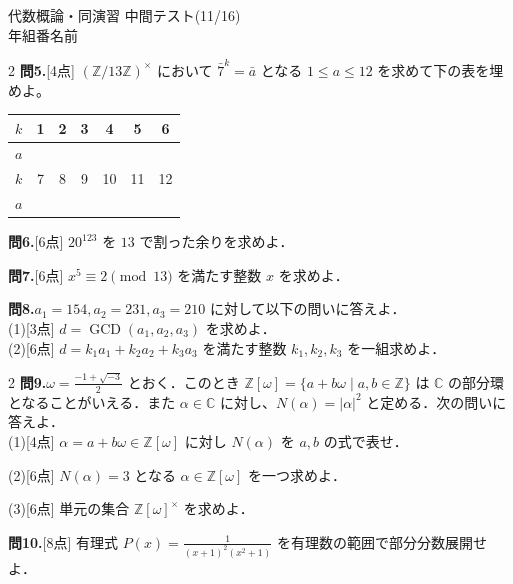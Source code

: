 \documentclass[a4paper,11pt]{jsarticle}
\newcommand{\testheader}{
\begin{center}
{\large 代数概論・同演習 中間テスト(11/16)}\\[1em]
\underline{\hspace{1cm}}年\underline{\hspace{1cm}}組\underline{\hspace{1cm}}番\hspace{0.5cm}名前\underline{\hspace{6cm}}
\end{center}
}
\begin{document}
\newpage

\testheader

\begin{multicols*}{2}
\noindent
\textbf{問5.}[4点] $(\mathbb{Z}/13\mathbb{Z})^{\times}$ において $\bar{7}^k = \bar{a}$ となる $1 \le a \le 12$ を求めて下の表を埋めよ。\\[0.5em]
\begin{tabular}{|c|c|c|c|c|c|c|}
\hline
$k$ & 1 & 2 & 3 & 4 & 5 & 6 \\ \hline
$a$ &  &  &  &  &  & \\ \hline
$k$ & 7 & 8 & 9 & 10& 11& 12\\ \hline
$a$ &  &  &  &  &  &  \\ \hline
\end{tabular}
\vspace{4cm}

\noindent
\textbf{問6.}[6点] $20^{123}$ を $13$ で割った余りを求めよ．
\vspace{7.5cm}

\noindent
\textbf{問7.}[6点] $x^5 \equiv 2 \pmod{13}$ を満たす整数 $x$ を求めよ．
\vspace{8cm}

\vfill\null
\columnbreak

\noindent
\textbf{問8.}\quad $a_1 = 154, a_2 = 231, a_3 = 210$ に対して以下の問いに答えよ．\\
(1)[3点] $d = \operatorname{GCD}(a_1, a_2, a_3)$ を求めよ．\\
(2)[6点] $d = k_1 a_1 + k_2 a_2 + k_3 a_3$ を満たす整数 $k_1, k_2, k_3$ を一組求めよ．

\vfill\null
\end{multicols*}

\newpage

\begin{multicols*}{2}
\noindent
\textbf{問9.}\quad $\omega = \frac{-1 + \sqrt{-3}}{2}$ とおく．このとき $\mathbb{Z}[\omega] = \{a + b\omega \mid a, b \in \mathbb{Z}\}$ は $\mathbb{C}$ の部分環となることがいえる．また $\alpha \in \mathbb{C}$ に対し、$N(\alpha) = |\alpha|^2$ と定める．次の問いに答えよ．\\[0.5em]
(1)[4点] $\alpha = a + b\omega \in \mathbb{Z}[\omega]$ に対し $N(\alpha)$ を $a, b$ の式で表せ．
\vspace{6.5cm}

\noindent
(2)[6点] $N(\alpha) = 3$ となる $\alpha \in \mathbb{Z}[\omega]$ を一つ求めよ．
\vspace{7.5cm}

\noindent
(3)[6点] 単元の集合 $\mathbb{Z}[\omega]^{\times}$ を求めよ．
\vspace{8.5cm}

\vfill\null
\columnbreak

\noindent
\textbf{問10.}[8点] 有理式 $\displaystyle P(x) = \frac{1}{(x+1)^2(x^2+1)}$ を有理数の範囲で部分分数展開せよ．
\vspace{24cm}

\vfill\null
\end{multicols*}
\end{document}
